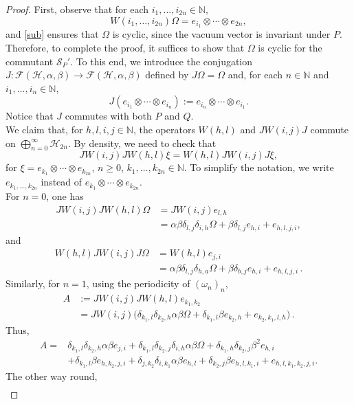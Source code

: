 \documentclass[12pt]{amsart}
\numberwithin{equation}{section}
\def\cf{{\mathcal F}}
\def\ch{{\mathcal H}}
\def\bn{{\mathbb N}}
\def\a{\alpha}
\def\b{\beta}
\def\om{\omega} \def\Om{\Omega}
\theoremstyle{definition}
\begin{document}
\begin{proof}
First, observe that  for each $i_1,...,i_{2n}\in\bn$,
\[
W(i_1,...,i_{2n})\Om= e_{i_1}\otimes \cdots \otimes e_{2n},
\]
and \eqref{sub} ensures that $\Om$ is cyclic, since the vacuum vector is invariant under $P$. Therefore, to complete the proof, it suffices to show that $\Om$ is cyclic for the commutant $\mathcal{S}_P'$. To this end, we introduce the conjugation $J:\cf(\ch,\a,\b)\rightarrow \cf(\ch,\a,\b)$ defined by $J\Om=\Om$ and, for each $n\in\bn$ and $i_1,\ldots,i_n\in\bn$,
\[
J(e_{i_1} \otimes \cdots \otimes e_{i_{n}}):= e_{i_{n}}\otimes \cdots \otimes e_{i_1}.
\]
Notice that $J$ commutes with both $P$ and $Q$.\\
We claim that, for  $h,l,i,j\in\bn$, the operators $W(h,l)$
and $JW(i,j)J$  commute on $\bigoplus_{n=0}^{\infty} \ch_{2n}$.
By density, we need to check that
$$JW(i,j)JW(h,l) \xi=W(h,l)JW(i,j)J \xi,$$
for $\xi=e_{k_1}\otimes \cdots\otimes e_{k_{2n}}$, $n\geq 0$, $k_1,\ldots,k_{2n}\in \bn$.
To simplify the notation, we write $e_{k_1,\ldots,k_{2n}}$ instead of $e_{k_1}\otimes \cdots\otimes e_{k_{2n}}$.\\
For $n=0$, one has
\begin{align*}
JW(i,j)JW(h,l)\Omega&= J W(i,j) e_{l, h}    \\
&=\a\b \delta_{l,j}\delta_{i,h} \Omega+ \b \delta_{l,j}
e_{h,i}+ e_{h,l,j,i},
\end{align*}
and
\begin{align*}
W(h,l)JW(i,j)J\Omega&=  W(h,l) e_{j, i}\\
&=\a\b\delta_{l,j}\delta_{h,a} \Omega+ \b \delta_{b,j}
e_{h,i}+ e_{h,l,j,i}\,.
\end{align*}
Similarly, for $n=1$, using the periodicity of $(\om_n)_n$,
\begin{align*}
A&:=JW(i,j)JW(h,l)e_{k_1,k_2}\\
&= J W(i,j)
    \big(\delta_{k_1,l}\delta_{k_2,h}\a\b \Omega +
    \delta_{k_1,l}\b e_{k_2,h}+e_{k_2,k_1,l,h})\,.
\end{align*}
Thus,
\begin{align*}
A=&\delta_{k_1,l}\delta_{k_2,h}\a\b e_{j,i}+
\delta_{k_1,l}\delta_{k_2,j}\delta_{i,h}\a\b\Omega+
\delta_{k_1,h}\delta_{k_2,j}\b^2e_{h,i}\\
&+\delta_{k_1,l}\b e_{h,k_2,j,i}+ \delta_{j,k_2}\delta_{i,k_1}\a\b
    e_{h,l}+ \delta_{k_2,j}\b e_{h,l,k_1,i} +
      e_{h,l,k_1,k_2,j,i}.
\end{align*}
The other way round,
\begin{align*}

\end{align*}
\end{proof}
\end{document}
